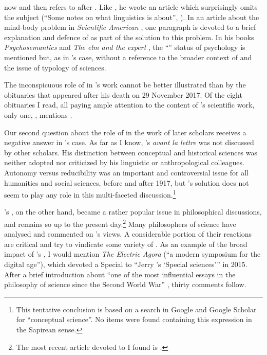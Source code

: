 \documentclass[output=paper]{langscibook}
\begin{document}
{\Fodor} now and then refers to  after \citeyear{Fodor1975}. Like {\Sapir}, he wrote an article which surprisingly omits the subject (``Some notes on what linguistics is about'', \citeyear{Fodor1985}). In an article about the mind-body problem in \emph{Scientific American} \citep{Fodor1981}, one paragraph is devoted to a brief explanation and defence of  as part of the solution to this problem. In his books \emph{Psychosemantics} \citep[5--6]{Fodor1987} and \emph{The elm and the expert} \citep[39]{Fodor1994}, the ``'' status of psychology is mentioned but, as in {\Sapir}'s case, without a reference to the broader context of  and the issue of typology of sciences.

The inconspicuous role of  in {\Fodor}'s work cannot be better illustrated than by the obituaries that appeared after his death on 29 November 2017. Of the eight obituaries I read, all paying ample attention to the content of {\Fodor}'s scientific work, only one, \citet{Rey2017}, mentions .

Our second question about the role of  in the work of later scholars receives a negative answer in {\Sapir}'s case. As far as I know, {\Sapir}'s  \emph{avant la lettre} was not discussed by other scholars. His distinction between conceptual and historical sciences was neither adopted nor criticized by his linguistic or anthropological colleagues. Autonomy versus reducibility was an important and controversial issue for all humanities and social sciences, before and after 1917, but {\Sapir}'s solution does not seem to play any role in this multi-faceted discussion.\footnote{This tentative conclusion is based on a search in Google and Google Scholar for ``conceptual science''. No items were found containing this expression in the Sapirean sense.}

{\Fodor}'s , on the other hand, became a rather popular issue in philosophical discussions, and remains so up to the present day.\footnote{The most recent article devoted to  I found is \citet{DiFrisco2017}.} Many philosophers of science have analysed and commented on {\Fodor}'s views. A considerable portion of their reactions are critical and try to vindicate some variety of . As an example of the broad impact of {\Fodor}'s , I would mention \emph{The Electric Agora} (``a modern symposium for the digital age''), which devoted a Special to ``Jerry {\Fodor}'s `Special sciences''' in 2015. After a brief introduction about ``one of the most influential essays in the philosophy of science since the Second World War'' \citep[1--2]{Kaufman2015}, thirty comments follow.
\end{document}
